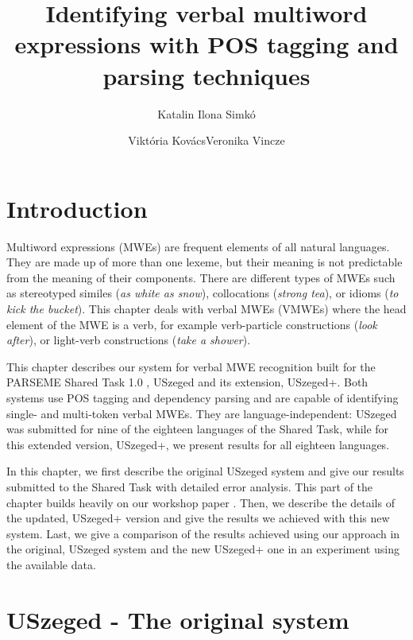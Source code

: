 \documentclass[output=paper,modfonts]{langscibook}
\title{Identifying verbal multiword expressions with POS tagging and parsing techniques}
\author{ Katalin Ilona Simkó\affiliation{University of Szeged}\and  Viktória Kovács\affiliation{University of Szeged}\lastand  Veronika Vincze\affiliation{University of Szeged\\MTA-SZTE Research Group on Artificial Intelligence}}
\begin{document}


\maketitle
\label{SIMKO-CHAPTER}

\section{Introduction} 
Multiword expressions (MWEs) are frequent elements of all natural languages. They are made up of more than one lexeme, but their meaning is not predictable from the meaning of their components. There are different types of MWEs such as stereotyped similes (\textit{as white as snow}), collocations (\textit{strong tea}), or idioms (\textit{to kick the bucket}). This chapter deals with verbal MWEs (VMWEs) where the head element of the MWE is a verb, for example verb-particle constructions (\textit{look after}), or light-verb constructions (\textit{take a shower}). 

This chapter describes our system for verbal MWE recognition built for the PARSEME Shared Task 1.0 \citep{MWEWorkshop}, USzeged
and its extension, USzeged+. Both systems use POS tagging and dependency parsing and are capable of identifying single- and multi-token verbal MWEs. They are language-independent: USzeged was submitted for nine of the eighteen languages of the Shared Task, while for this extended version, USzeged+, we present results for all eighteen languages. 

In this chapter, we first describe the original USzeged system and give our results submitted to the Shared Task with detailed error analysis. This part of the chapter builds heavily on our workshop paper \citep{Simko2017}. Then, we describe the details of the updated, USzeged+ version and give the results we achieved with this new system. Last, we give a comparison of the results achieved using our approach in the original, USzeged system and the new USzeged+ one in an experiment using the available  data.

\section{USzeged - The original system}
\end{document}
